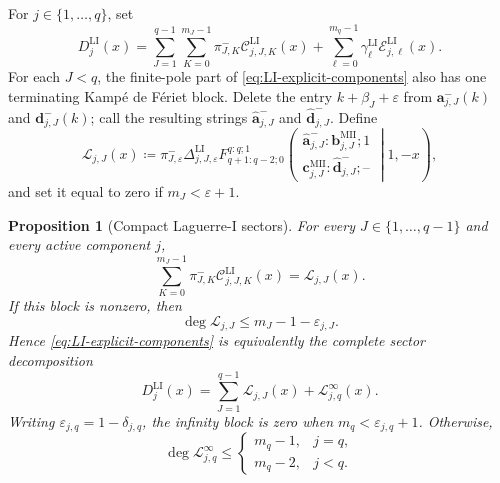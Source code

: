 \documentclass[10pt]{amsart}
\theoremstyle{plain}
\newtheorem{proposition}[theorem]{Proposition}
\theoremstyle{definition}
\theoremstyle{remark}
\begin{document}
For \(j\in\{1,\ldots,q\}\), set
\begin{equation}
 D_j^{\mathrm{LI}}(x)=
 \sum_{J=1}^{q-1}\sum_{K=0}^{m_J-1}
 \pi_{J,K}^{-}\mathcal C_{j,J,K}^{\mathrm{LI}}(x)
 +\sum_{\ell=0}^{m_q-1}
 \gamma_\ell^{\mathrm{LI}}
 \mathcal E_{j,\ell}^{\mathrm{LI}}(x).
 \label{eq:LI-explicit-components}
\end{equation}
For each \(J<q\), the finite-pole part of
\eqref{eq:LI-explicit-components} also has one terminating
Kamp\'e de F\'eriet block. Delete the entry
\(k+\beta_J+\varepsilon\) from
\(\boldsymbol a_{j,J}^{-}(k)\) and
\(\boldsymbol d_{j,J}^{-}(k)\); call the resulting strings
\(\widehat{\boldsymbol a}_{j,J}^{-}\) and
\(\widehat{\boldsymbol d}_{j,J}^{-}\). Define
\begin{equation}
 \mathscr L_{j,J}(x)
 \coloneq \pi_{J,\varepsilon}^{-}
 \Delta_{j,J,\varepsilon}^{\mathrm{LI}}
 F_{q+1:q-2;0}^{q:q;1}
 \left(
 \begin{matrix}
  \widehat{\boldsymbol a}_{j,J}^{-}:
  \boldsymbol b_{j,J}^{\mathrm{MII}};1\\
  \boldsymbol c_{j,J}^{\mathrm{MII}}:
  \widehat{\boldsymbol d}_{j,J}^{-};\text{--}
 \end{matrix}
 \middle|1,-x\right),
 \label{eq:LI-compact-finite-pole-block}
\end{equation}
and set it equal to zero if \(m_J<\varepsilon+1\).

\begin{proposition}[Compact Laguerre-I sectors]
\label{prop:LI-compact-finite-poles}
For every \(J\in\{1,\ldots,q-1\}\) and every active component \(j\),
\begin{equation}
 \sum_{K=0}^{m_J-1}\pi_{J,K}^{-}
 \mathcal C_{j,J,K}^{\mathrm{LI}}(x)
 =\mathscr L_{j,J}(x).
 \label{eq:LI-compact-finite-pole-identity}
\end{equation}
If this block is nonzero, then
\begin{equation}
 \deg\mathscr L_{j,J}
 \le m_J-1-\varepsilon_{j,J}.
 \label{eq:LI-finite-sector-degree}
\end{equation}
Hence \eqref{eq:LI-explicit-components} is equivalently the complete
sector decomposition
\begin{equation}
 D_j^{\mathrm{LI}}(x)=
 \sum_{J=1}^{q-1}\mathscr L_{j,J}(x)
 +\mathscr L_{j,q}^{\infty}(x).
 \label{eq:LI-compact-components}
\end{equation}
Writing \(\varepsilon_{j,q}=1-\delta_{j,q}\), the infinity block is zero
when \(m_q<\varepsilon_{j,q}+1\). Otherwise,
\begin{equation}
 \deg\mathscr L_{j,q}^{\infty}\le
 \begin{cases}
  m_q-1,&j=q,\\
  m_q-2,&j<q.
 \end{cases}
 \label{eq:LI-infinity-sector-degree}
\end{equation}
\end{proposition}
\end{document}
